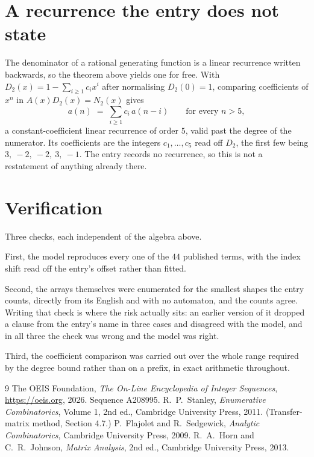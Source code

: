 \documentclass[11pt,a4paper]{article}
\theoremstyle{plain}
\theoremstyle{definition}
\begin{document}
\section{A recurrence the entry does not state}

The denominator of a rational generating function is a linear recurrence written backwards, so
the theorem above yields one for free. With $D_2(x)=1-\sum_{i\ge1}c_ix^i$ after normalising
$D_2(0)=1$, comparing coefficients of $x^n$ in $A(x)D_2(x)=N_2(x)$ gives
\[
a(n)\;=\;\sum_{i\ge1}c_i\,a(n-i)\qquad\text{for every }n>5,
\]
a constant-coefficient linear recurrence of order $5$, valid past the degree of the
numerator. Its coefficients are the integers $c_1,\dots,c_{5}$ read off $D_2$, the first few being $3,\ -2,\ -2,\ 3,\ -1$. The entry records no recurrence, so this is not a restatement of anything
already there.

\section{Verification}

Three checks, each independent of the algebra above.

First, the model reproduces every one of the $44$ published terms, with the index shift
read off the entry's offset rather than fitted.

Second, the arrays themselves were enumerated for the smallest shapes the entry counts,
directly from its English and with no automaton, and the counts agree. Writing that check is
where the risk actually sits: an earlier version of it dropped a clause from the entry's name
in three cases and disagreed with the model, and in all three the check was wrong and the model
was right.

Third, the coefficient comparison was carried out over the whole range required by the degree
bound rather than on a prefix, in exact arithmetic throughout.

\begin{thebibliography}{9}
 The OEIS Foundation, \emph{The On-Line Encyclopedia of Integer
Sequences}, \url{https://oeis.org}, 2026. Sequence A208995.
 R.~P.~Stanley, \emph{Enumerative Combinatorics}, Volume 1, 2nd ed.,
Cambridge University Press, 2011. (Transfer-matrix method, Section 4.7.)
 P.~Flajolet and R.~Sedgewick, \emph{Analytic Combinatorics}, Cambridge
University Press, 2009.
 R.~A.~Horn and C.~R.~Johnson, \emph{Matrix Analysis}, 2nd ed., Cambridge
University Press, 2013.
\end{thebibliography}
\end{document}
